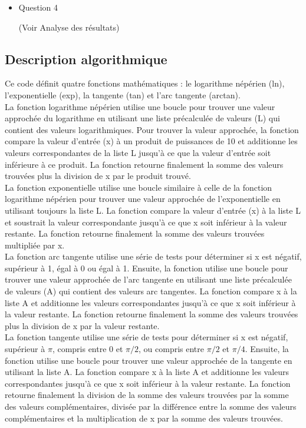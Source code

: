 \documentclass{article}
\begin{document}
\begin{itemize}
\item{Question 4}

(Voir Analyse des résultats)
\end{itemize}


\subsection{Description algorithmique}

Ce code définit quatre fonctions mathématiques : le logarithme népérien (ln), l'exponentielle (exp), la tangente (tan) et l'arc tangente (arctan).\\

La fonction logarithme népérien utilise une boucle pour trouver une valeur approchée du logarithme en utilisant une liste précalculée de valeurs (L) qui contient des valeurs logarithmiques. Pour trouver la valeur approchée, la fonction compare la valeur d'entrée (x) à un produit de puissances de 10 et additionne les valeurs correspondantes de la liste L jusqu'à ce que la valeur d'entrée soit inférieure à ce produit. La fonction retourne finalement la somme des valeurs trouvées plus la division de x par le produit trouvé.\\

La fonction exponentielle utilise une boucle similaire à celle de la fonction logarithme népérien pour trouver une valeur approchée de l'exponentielle en utilisant toujours la liste L. La fonction compare la valeur d'entrée (x) à la liste L et soustrait la valeur correspondante jusqu'à ce que x soit inférieur à la valeur restante. La fonction retourne finalement la somme des valeurs trouvées multipliée par x.\\

La fonction arc tangente utilise une série de tests pour déterminer si x est négatif, supérieur à 1, égal à 0 ou égal à 1. Ensuite, la fonction utilise une boucle pour trouver une valeur approchée de l'arc tangente en utilisant une liste précalculée de valeurs (A) qui contient des valeurs arc tangentes. La fonction compare x à la liste A et additionne les valeurs correspondantes jusqu'à ce que x soit inférieur à la valeur restante. La fonction retourne finalement la somme des valeurs trouvées plus la division de x par la valeur restante.\\

La fonction tangente utilise une série de tests pour déterminer si x est négatif, supérieur à $\pi$, compris entre 0 et $\pi/2$, ou compris entre $\pi/2$ et $\pi/4$. Ensuite, la fonction utilise une boucle pour trouver une valeur approchée de la tangente en utilisant la liste A. La fonction compare x à la liste A et additionne les valeurs correspondantes jusqu'à ce que x soit inférieur à la valeur restante. La fonction retourne finalement la division de la somme des valeurs trouvées par la somme des valeurs complémentaires, divisée par la différence entre la somme des valeurs complémentaires et la multiplication de x par la somme des valeurs trouvées.\\
\end{document}
